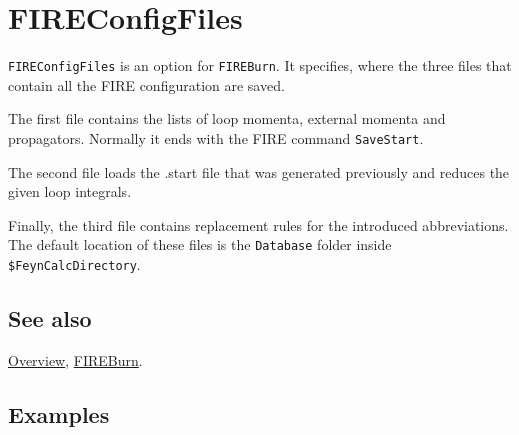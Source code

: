 \documentclass[../FeynHelpersManual.tex]{subfiles}
\begin{document}
\hypertarget{fireconfigfiles}{
\section{FIREConfigFiles}\label{fireconfigfiles}}

\texttt{FIREConfigFiles} is an option for \texttt{FIREBurn}. It
specifies, where the three files that contain all the FIRE configuration
are saved.

The first file contains the lists of loop momenta, external momenta and
propagators. Normally it ends with the FIRE command \texttt{SaveStart}.

The second file loads the .start file that was generated previously and
reduces the given loop integrals.

Finally, the third file contains replacement rules for the introduced
abbreviations. The default location of these files is the
\texttt{Database} folder inside \texttt{\$FeynCalcDirectory}.

\subsection{See also}

\hyperlink{toc}{Overview}, \hyperlink{fireburn}{FIREBurn}.

\subsection{Examples}
\end{document}
